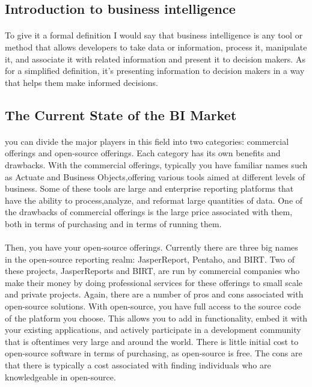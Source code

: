 \subsection{Introduction to business intelligence}

\paragraph{}
To give it a formal definition I would say that business intelligence is any tool or method that allows developers to take data or information, process it, manipulate it, and associate it with related information and present it to decision makers. As for a simplified definition, it's presenting information to decision makers in a way that helps them make informed decisions.

\subsection{The Current State of the BI Market}
\paragraph{}
you can divide the major players in this field into two categories: commercial offerings and open-source offerings. Each category has its own benefits and drawbacks. With the commercial offerings, typically you have familiar names such as Actuate and Business Objects,offering various tools aimed at different levels of business. Some of these tools are large and enterprise reporting platforms that have the ability to process,analyze, and reformat large quantities of data. One of the drawbacks of commercial offerings is the large price associated with them, both in terms of purchasing and in terms of running them. 

\paragraph{}
Then, you have your open-source offerings. Currently there are three big names in the open-source reporting realm: JasperReport, Pentaho, and BIRT. Two of these projects, JasperReports and BIRT, are run by commercial companies who make their money by doing professional services for these offerings to small scale and private projects. Again, there are a number of pros and cons associated with open-source solutions. With open-source, you have full access to the source code of the platform you choose. This allows you to add in functionality, embed it with your existing applications, and actively participate in a development community that is oftentimes very large and around the world. There is little initial cost to open-source software in terms of purchasing, as open-source is free. The cons are that there is typically a cost associated with finding individuals who are knowledgeable in open-source.

